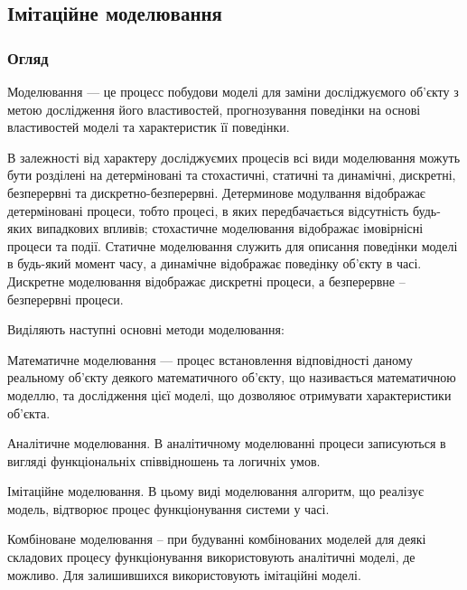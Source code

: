 
\subsection{Імітаційне моделювання}
\subsubsection{Огляд}
Моделювання --- це процесс побудови моделі для заміни досліджуємого об’єкту з метою дослідження його властивостей, прогнозування поведінки на основі властивостей моделі та характеристик її поведінки\cite{model}.

В залежності від характеру досліджуємих процесів всі види моделювання можуть бути розділені на детерміновані та стохастичні, статичні та динамічні, дискретні, безперервні та дискретно-безперервні. Детерминове модулвання відображає детерміновані процеси, тобто процесі, в яких передбачається відсутність будь-яких випадкових впливів; стохастичне моделювання відображає імовірнісні процеси та події. Статичне моделювання служить для описання поведінки моделі в будь-який момент часу, а динамічне відображає поведінку об’єкту в часі. Дискретне моделювання відображає дискретні процеси, а безперервне -- безперервні процеси\cite{model}.

Виділяють наступні основні методи моделювання\cite{model}:
\begin{longEnumerate}
   \item Математичне моделювання --- процес встановлення відповідності даному реальному об’єкту деякого математичного об’єкту, що називається математичною моделлю, та дослідження цієї моделі, що дозволяює отримувати характеристики об’єкта. 
   \item Аналітичне моделювання. В аналітичному моделюванні процеси записуються в вигляді функціональніх співвідношень та логичніх умов.
   \item Імітаційне моделювання. В цьому виді моделювання алгоритм, що реалізує модель, відтворює процес функціонування системи у часі.
   \item Комбіноване моделювання -- при будуванні комбінованих моделей для деякі складових процесу функціонування використовують аналітичні моделі, де можливо. Для залишившихся використовують імітаційні моделі.
\end{longEnumerate}

